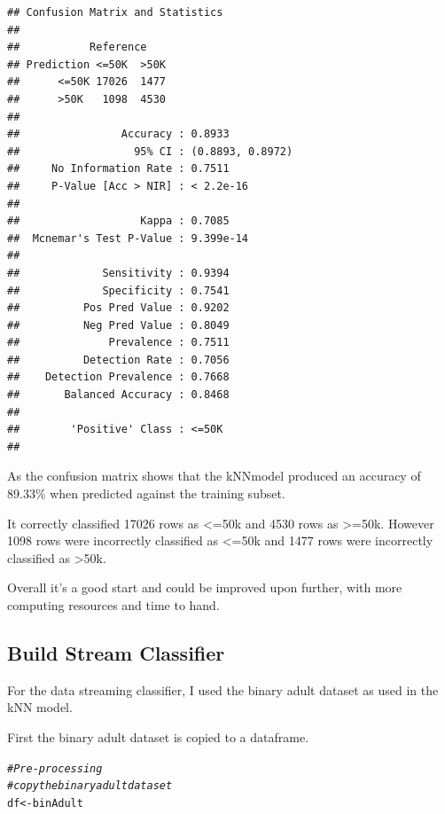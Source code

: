 \documentclass[10pt  ,usenames, dvipsnames]{article}\usepackage[]{graphicx}\usepackage[]{color}
\makeatletter
\newcommand{\hlcom}[1]{\textcolor[rgb]{0.678,0.584,0.686}{\textit{#1}}}%
\newcommand{\hlstd}[1]{\textcolor[rgb]{0.345,0.345,0.345}{#1}}%
\newcommand{\hlkwb}[1]{\textcolor[rgb]{0.69,0.353,0.396}{#1}}%
\newenvironment{kframe}{%
 \def\at@end@of@kframe{}%
 \ifinner\ifhmode%
  \def\at@end@of@kframe{\end{minipage}}%
  \begin{minipage}{\columnwidth}%
 \fi\fi%
 \def\FrameCommand##1{\hskip\@totalleftmargin \hskip-\fboxsep
 \colorbox{shadecolor}{##1}\hskip-\fboxsep
     \hskip-\linewidth \hskip-\@totalleftmargin \hskip\columnwidth}%
 \MakeFramed {\advance\hsize-\width
   \@totalleftmargin\z@ \linewidth\hsize
   \@setminipage}}%
 {\par\unskip\endMakeFramed%
 \at@end@of@kframe}
\newenvironment{knitrout}{}{} %
\makeatother
\begin{document}
\begin{knitrout}
\color{fgcolor}\begin{kframe}
\begin{verbatim}
## Confusion Matrix and Statistics
## 
##           Reference
## Prediction <=50K  >50K
##      <=50K 17026  1477
##      >50K   1098  4530
##                                           
##                Accuracy : 0.8933          
##                  95% CI : (0.8893, 0.8972)
##     No Information Rate : 0.7511          
##     P-Value [Acc > NIR] : < 2.2e-16       
##                                           
##                   Kappa : 0.7085          
##  Mcnemar's Test P-Value : 9.399e-14       
##                                           
##             Sensitivity : 0.9394          
##             Specificity : 0.7541          
##          Pos Pred Value : 0.9202          
##          Neg Pred Value : 0.8049          
##              Prevalence : 0.7511          
##          Detection Rate : 0.7056          
##    Detection Prevalence : 0.7668          
##       Balanced Accuracy : 0.8468          
##                                           
##        'Positive' Class : <=50K           
## 
\end{verbatim}
\end{kframe}
\end{knitrout}

As the confusion matrix shows that the kNNmodel produced an accuracy of 89.33\% when predicted against the training subset.

It correctly classified 17026 rows as <=50k and 4530 rows as >=50k.
However 1098 rows were incorrectly classified as <=50k and 1477 rows were incorrectly classified as >50k.

Overall it's a good start and could be improved upon further, with more computing resources and time to hand.

\clearpage

\subsection{Build Stream Classifier}

For the data streaming classifier, I used the binary adult dataset as used in the kNN model.

First the binary adult dataset is copied to a dataframe.

\begin{knitrout}
\color{fgcolor}\begin{kframe}
\begin{alltt}
\hlcom{#Pre-processing}
\hlcom{#copy the binary adult dataset}
\hlstd{df} \hlkwb{<-} \hlstd{binAdult}
\end{alltt}
\end{kframe}
\end{knitrout}
\end{document}
